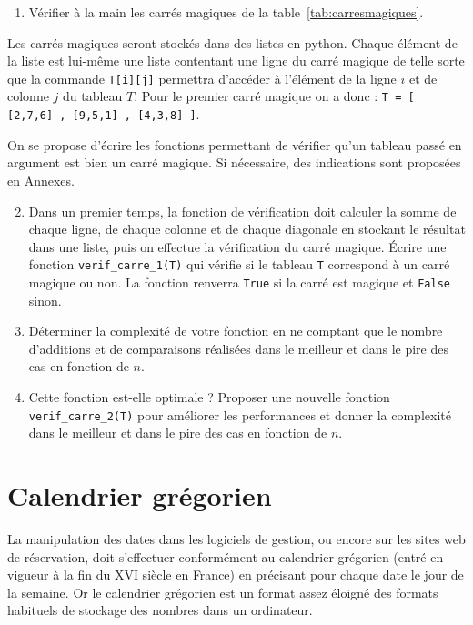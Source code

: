 \begin{enumerate}
 \item Vérifier à la main les carrés magiques de la table~\ref{tab:carresmagiques}.
\end{enumerate}

Les carrés magiques seront stockés dans des listes en python. Chaque élément de la liste est lui-même une liste contentant une ligne du carré magique de telle sorte que la commande \texttt{T[i][j]} permettra d'accéder à l'élément de la ligne $i$ et de colonne $j$ du tableau $T$. Pour le premier carré magique on a donc : \texttt{T = [ [2,7,6] , [9,5,1] , [4,3,8] ]}.

On se propose d'écrire les fonctions permettant de vérifier qu'un tableau passé en argument est bien un carré magique. Si nécessaire, des indications sont proposées en Annexes.

\begin{enumerate}
\setcounter{enumi}{1}
 \item Dans un premier temps, la fonction de vérification doit calculer la somme de chaque ligne, de chaque colonne et de chaque diagonale en stockant le résultat dans une liste, puis on effectue la vérification du carré magique. Écrire une fonction \texttt{verif\_carre\_1(T)} qui vérifie si le tableau \texttt{T} correspond à un carré magique ou non. La fonction renverra \texttt{True} si la carré est magique et \texttt{False} sinon.

 \item Déterminer la complexité de votre fonction en ne comptant que le nombre d'additions et de comparaisons réalisées dans le meilleur et dans le pire des cas en fonction de $n$.

 \item Cette fonction est-elle optimale ? Proposer une nouvelle fonction \texttt{verif\_carre\_2(T)} pour améliorer les performances et donner la complexité dans le meilleur et dans le pire des cas en fonction de $n$.
 
\end{enumerate}


\newpage
\section{Calendrier grégorien}

La manipulation des dates dans les logiciels de gestion, ou encore sur les sites web de réservation, doit s'effectuer conformément au calendrier grégorien (entré en vigueur à la fin du XVI siècle en France) en précisant pour chaque date le jour de la semaine. Or le calendrier grégorien est un format assez éloigné des formats habituels de stockage des nombres dans un ordinateur. 

